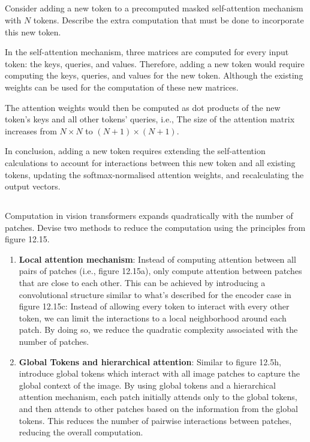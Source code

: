 \documentclass[12pt]{report}
\begin{document}
\subsection{}
\begin{mdframed}
    Consider adding a new token to a precomputed masked self-attention mechanism with $N$ tokens. Describe the extra computation that must be done to incorporate this new token.
\end{mdframed}

In the self-attention mechanism, three matrices are computed for every input token: the keys, queries, and values. Therefore, adding a new token would require computing the keys, queries, and values for the new token. Although the existing weights can be used for the computation of these new matrices.

The attention weights would then be computed as dot products of the new token's keys and all other tokens' queries, i.e., The size of the attention matrix increases from $N \times N$ to $(N+1) \times (N+1)$.

In conclusion, adding a new token requires extending the self-attention calculations to account for interactions between this new token and all existing tokens, updating the softmax-normalised attention weights, and recalculating the output vectors.

\subsection{}
\begin{mdframed}
    Computation in vision transformers expands quadratically with the number of patches. Devise two methods to reduce the computation using the principles from figure 12.15.
\end{mdframed}

\begin{enumerate}
    \item \textbf{Local attention mechanism}: Instead of computing attention between all pairs of patches (i.e., figure 12.15a), only compute attention between patches that are close to each other. This can be achieved by introducing a convolutional structure similar to what's described for the encoder case in figure 12.15c: Instead of allowing every token to interact with every other token, we can limit the interactions to a local neighborhood around each patch. By doing so, we reduce the quadratic complexity associated with the number of patches.
    \item \textbf{Global Tokens and hierarchical attention}: Similar to figure 12.5h, introduce global tokens which interact with all image patches to capture the global context of the image. By using global tokens and a hierarchical attention mechanism, each patch initially attends only to the global tokens, and then attends to other patches based on the information from the global tokens. This reduces the number of pairwise interactions between patches, reducing the overall computation.
\end{enumerate}
\end{document}

